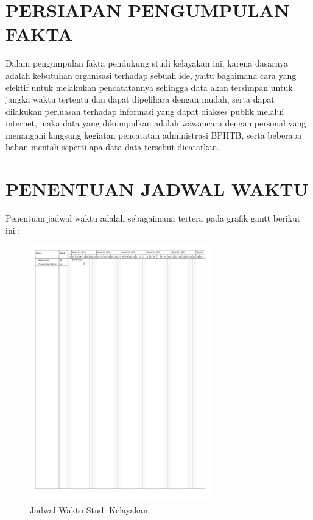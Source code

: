 \documentclass[pdftex,12pt, oneside]{article}
\begin{document}
\section{PERSIAPAN PENGUMPULAN FAKTA}

Dalam pengumpulan fakta pendukung studi kelayakan ini, karena dasarnya adalah kebutuhan organisasi terhadap sebuah ide, yaitu bagaimana cara yang efektif untuk melakukan pencatatannya sehingga data akan tersimpan untuk jangka waktu tertentu dan dapat dipelihara dengan mudah, serta dapat dilakukan perluasan terhadap informasi yang dapat diakses publik melalui internet, maka data yang dikumpulkan adalah wawancara dengan personal yang menangani langsung kegiatan pencatatan administrasi BPHTB, serta beberapa bahan mentah seperti apa data-data tersebut dicatatkan.

\section{PENENTUAN JADWAL WAKTU}

Penentuan jadwal waktu adalah sebagaimana tertera pada grafik gantt berikut ini :

\begin{figure}[H]
  \centering
  \includegraphics[width=0.7\textwidth]{./resources/jadwal-studi-kelayakan}
  \caption{Jadwal Waktu Studi Kelayakan}
\end{figure}
\end{document}
